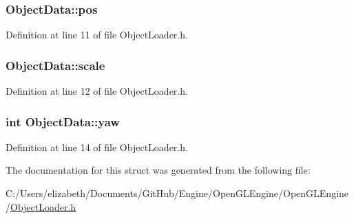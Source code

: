 \subsubsection[{\texorpdfstring{pos}{pos}}]{ Object\+Data\+::pos}\hypertarget{struct_object_data_aeb9bfcc1a43824ac59233da2ed0909e6}{}\label{struct_object_data_aeb9bfcc1a43824ac59233da2ed0909e6}


Definition at line 11 of file Object\+Loader.\+h.

\subsubsection[{\texorpdfstring{scale}{scale}}]{ Object\+Data\+::scale}\hypertarget{struct_object_data_ab9944e8519f068949e46414db9e619e2}{}\label{struct_object_data_ab9944e8519f068949e46414db9e619e2}


Definition at line 12 of file Object\+Loader.\+h.

\subsubsection[{\texorpdfstring{yaw}{yaw}}]{\setlength{\rightskip}{0pt plus 5cm}int Object\+Data\+::yaw}\hypertarget{struct_object_data_a130d0b0e19b50e6e58ad1d9c54affd45}{}\label{struct_object_data_a130d0b0e19b50e6e58ad1d9c54affd45}


Definition at line 14 of file Object\+Loader.\+h.



The documentation for this struct was generated from the following file\+:\begin{DoxyCompactItemize}
\item 
C\+:/\+Users/elizabeth/\+Documents/\+Git\+Hub/\+Engine/\+Open\+G\+L\+Engine/\+Open\+G\+L\+Engine/\hyperlink{_object_loader_8h}{Object\+Loader.\+h}\end{DoxyCompactItemize}
